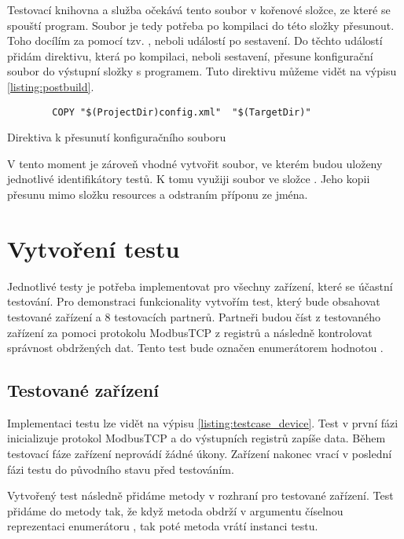Testovací knihovna a služba očekává tento soubor v kořenové složce, ze které se spouští program. Soubor je tedy potřeba po kompilaci do této složky přesunout. Toho docílím za pomocí tzv. , neboli událostí po sestavení. Do těchto událostí přidám direktivu, která po kompilaci, neboli sestavení, přesune konfigurační soubor do výstupní složky s programem. Tuto direktivu můžeme vidět na výpisu \ref{listing:postbuild}.

\begin{listing}[htbp]
    \centering
    \begin{verbatim}
        COPY "$(ProjectDir)config.xml"  "$(TargetDir)"
    \end{verbatim}
\caption{Direktiva k přesunutí konfiguračního souboru}
\label{listing:postbuild}
\end{listing}

V tento moment je zároveň vhodné vytvořit soubor, ve kterém budou uloženy jednotlivé identifikátory testů. K tomu využiji soubor  ve složce . Jeho kopii přesunu mimo složku resources a odstraním příponu  ze jména. 

\section{Vytvoření testu}
Jednotlivé testy je potřeba implementovat pro všechny zařízení, které se účastní testování. Pro demonstraci funkcionality vytvořím test, který bude obsahovat testované zařízení a 8 testovacích partnerů. Partneři budou číst z testovaného zařízení za pomoci protokolu ModbusTCP z registrů a následně kontrolovat správnost obdržených dat. Tento test bude označen enumerátorem  hodnotou .


\subsection{Testované zařízení}
Implementaci testu lze vidět na výpisu \ref{listing:testcase_device}. Test v první fázi inicializuje protokol ModbusTCP a do výstupních registrů zapíše data. Během testovací fáze zařízení neprovádí žádné úkony. Zařízení nakonec vrací v poslední fázi testu do původního stavu před testováním.

Vytvořený test následně přidáme metody  v rozhraní pro testované zařízení. Test přidáme do metody tak, že když metoda obdrží v argumentu číselnou reprezentaci enumerátoru , tak poté metoda vrátí instanci testu.


